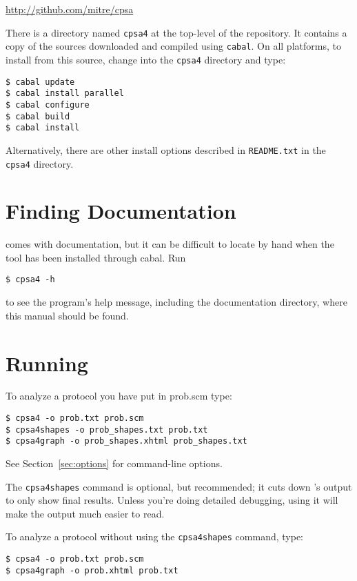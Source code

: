 \begin{center}
  \url{http://github.com/mitre/cpsa}
\end{center}

There is a directory named \texttt{cpsa4} at the top-level of the
repository.  It contains a copy of the {\cpsa} sources downloaded and
compiled using \texttt{cabal}.  On all platforms, to install from this
source, change into the \texttt{cpsa4} directory and type:

\begin{verbatim}
$ cabal update
$ cabal install parallel
$ cabal configure
$ cabal build
$ cabal install
\end{verbatim}

Alternatively, there are other install options described in
\texttt{README.txt} in the \texttt{cpsa4} directory.

\section{Finding Documentation}
{\cpsa} comes with documentation, but it can be difficult to locate by
hand when the tool has been installed through cabal.  Run

\texttt{\$ cpsa4 -h}

\noindent
to see the program's help message, including the documentation
directory, where this manual should be found.

\section{Running {\cpsa}}
\label{sec:running}

To analyze a protocol you have put in prob.scm type:
\begin{verbatim}
$ cpsa4 -o prob.txt prob.scm
$ cpsa4shapes -o prob_shapes.txt prob.txt
$ cpsa4graph -o prob_shapes.xhtml prob_shapes.txt
\end{verbatim}

See Section~\ref{sec:options} for command-line options.

The \texttt{cpsa4shapes} command is optional, but recommended; it cuts
down {\cpsa}'s output to only show final results. Unless you're
doing detailed debugging, using it will make the output much easier to
read.

To analyze a protocol without using the \texttt{cpsa4shapes} command, type:
\begin{verbatim}
$ cpsa4 -o prob.txt prob.scm
$ cpsa4graph -o prob.xhtml prob.txt
\end{verbatim}

